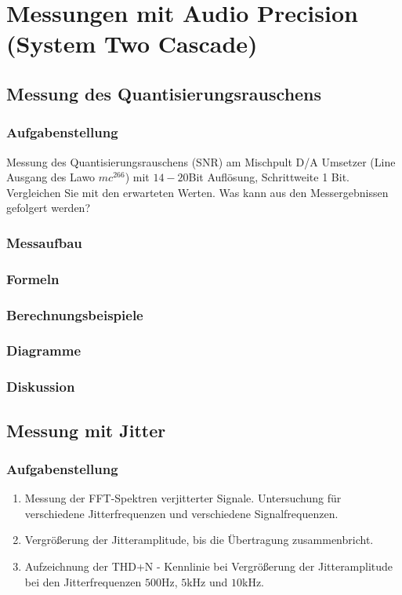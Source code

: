 \section{Messungen mit Audio Precision (System Two Cascade)}
\subsection{Messung des Quantisierungsrauschens}
\subsubsection{Aufgabenstellung}
Messung des Quantisierungsrauschens (SNR) am Mischpult D/A Umsetzer (Line Ausgang des Lawo $mc^266$) mit $14-20$Bit Auflösung, Schrittweite 1 Bit. Vergleichen Sie mit den erwarteten Werten. Was kann aus den Messergebnissen gefolgert werden?

\subsubsection{Messaufbau}

\subsubsection{Formeln}

\subsubsection{Berechnungsbeispiele}

\subsubsection{Diagramme}

\subsubsection{Diskussion}


\subsection{Messung mit Jitter}
\subsubsection{Aufgabenstellung}
\begin{enumerate}
\item Messung der FFT-Spektren verjitterter Signale. Untersuchung für verschiedene Jitterfrequenzen und verschiedene Signalfrequenzen.
\item Vergrößerung der Jitteramplitude, bis die Übertragung zusammenbricht.
\item Aufzeichnung der THD+N - Kennlinie bei Vergrößerung der Jitteramplitude bei den Jitterfrequenzen $500$Hz, $5$kHz und $10$kHz. 
\end{enumerate}

